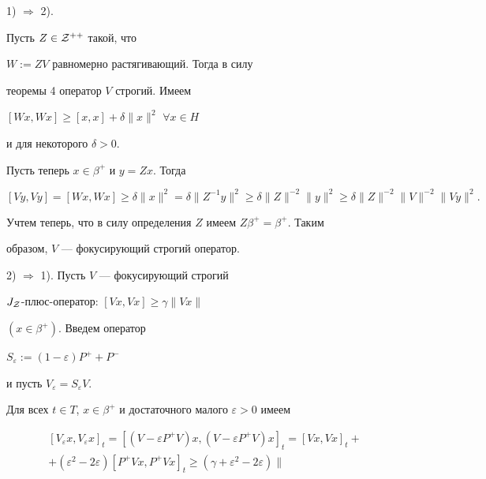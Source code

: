 \begin{pf}





1) $\Rightarrow$ 2).


Пусть $Z\in {\cal Z}^{++}$ такой, что


$W:=ZV$ равномерно растягивающий. Тогда в силу


теоремы 4 оператор $V$ строгий. Имеем 


$[Wx,Wx]\geq [x,x]+\delta\| x\|^{2}$ $\forall x\in H$


и для некоторого $\delta >0$.





Пусть теперь $x\in\beta^{+}$ и $y=Zx$. Тогда


$$


[Vy,Vy]=[Wx,Wx]\geq\delta \| x\|^{2}=


\delta\| Z^{-1}y\|^{2}\geq


\delta\| Z\|^{-2}\| y\|^{2}\geq


\delta\| Z\|^{-2}\| V\|^{-2}\| Vy\|^{2}.


$$


Учтем теперь, что в силу определения $Z$ имеем $Z\beta^{+}=\beta^{+}$. Таким


образом, $V$ --- фокусирующий строгий оператор.





2) $\Rightarrow$ 1). Пусть $V$ --- фокусирующий строгий


$J_{\cal Z}$-плюс-оператор: $[Vx,Vx]\geq \gamma\| Vx\|$


$(x\in \beta^{+})$. Введем оператор


$S_{\varepsilon}:=(1-\varepsilon )P^{+}+P^{-}$


и пусть $V_{\varepsilon}=S_{\varepsilon}V$.


Для всех $t\in T$, $x\in


\beta^{+}$ и достаточного малого $\varepsilon >0$ имеем


\begin{multline}


[V_{\varepsilon}x,V_{\varepsilon}x]_{t}=[(V-\varepsilon


P^{+}V)x,(V-\varepsilon P^{+}V)x]_{t}=


[Vx,Vx]_{t}+ \\ + (\varepsilon^{2}-2\varepsilon )[P^{+}Vx,P^{+}Vx]_{t}\geq


(\gamma +\varepsilon^{2}-2\varepsilon )\|



\end{multline}
\end{pf}
